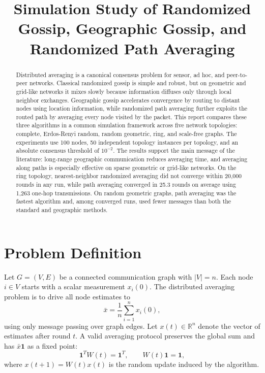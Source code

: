 \documentclass[conference]{IEEEtran}
\title{Simulation Study of Randomized Gossip, Geographic Gossip, and Randomized Path Averaging}
\author{
\IEEEauthorblockN{Gossip Framework Simulation Report}
\IEEEauthorblockA{Generated from 100-node, 50-trial topology benchmarks}
}
\begin{document}
\maketitle

\begin{abstract}
Distributed averaging is a canonical consensus problem for sensor, ad hoc, and peer-to-peer networks. Classical randomized gossip is simple and robust, but on geometric and grid-like networks it mixes slowly because information diffuses only through local neighbor exchanges. Geographic gossip accelerates convergence by routing to distant nodes using location information, while randomized path averaging further exploits the routed path by averaging every node visited by the packet. This report compares these three algorithms in a common simulation framework across five network topologies: complete, Erdos-Renyi random, random geometric, ring, and scale-free graphs. The experiments use 100 nodes, 50 independent topology instances per topology, and an absolute consensus threshold of $10^{-2}$. The results support the main message of the literature: long-range geographic communication reduces averaging time, and averaging along paths is especially effective on sparse geometric or grid-like networks. On the ring topology, nearest-neighbor randomized averaging did not converge within 20,000 rounds in any run, while path averaging converged in 25.3 rounds on average using 1,263 one-hop transmissions. On random geometric graphs, path averaging was the fastest algorithm and, among converged runs, used fewer messages than both the standard and geographic methods.
\end{abstract}

\section{Problem Definition}
Let $G=(V,E)$ be a connected communication graph with $|V|=n$. Each node $i \in V$ starts with a scalar measurement $x_i(0)$. The distributed averaging problem is to drive all node estimates to
\begin{equation}
    \bar{x} = \frac{1}{n}\sum_{i=1}^{n}x_i(0),
\end{equation}
using only message passing over graph edges. Let $x(t) \in \mathbb{R}^{n}$ denote the vector of estimates after round $t$. A valid averaging protocol preserves the global sum and has $\bar{x}\mathbf{1}$ as a fixed point:
\begin{equation}
    \mathbf{1}^{T}W(t)=\mathbf{1}^{T}, \qquad W(t)\mathbf{1}=\mathbf{1},
\end{equation}
where $x(t+1)=W(t)x(t)$ is the random update induced by the algorithm.
\end{document}
